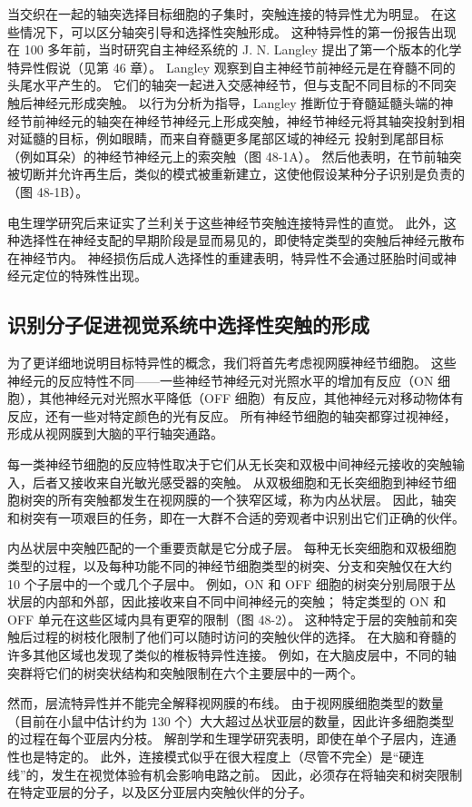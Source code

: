 当交织在一起的轴突选择目标细胞的子集时，突触连接的特异性尤为明显。 在这些情况下，可以区分轴突引导和选择性突触形成。 这种特异性的第一份报告出现在 100 多年前，当时研究自主神经系统的 J. N. Langley 提出了第一个版本的化学特异性假说（见第 46 章）。 Langley 观察到自主神经节前神经元是在脊髓不同的头尾水平产生的。 它们的轴突一起进入交感神经节，但与支配不同目标的不同突触后神经元形成突触。 以行为分析为指导，Langley 推断位于脊髓延髓头端的神经节前神经元的轴突在神经节神经元上形成突触，神经节神经元将其轴突投射到相对延髓的目标，例如眼睛，而来自脊髓更多尾部区域的神经元 投射到尾部目标（例如耳朵）的神经节神经元上的索突触（图 48-1A）。 然后他表明，在节前轴突被切断并允许再生后，类似的模式被重新建立，这使他假设某种分子识别是负责的（图 48-1B）。

电生理学研究后来证实了兰利关于这些神经节突触连接特异性的直觉。 此外，这种选择性在神经支配的早期阶段是显而易见的，即使特定类型的突触后神经元散布在神经节内。 神经损伤后成人选择性的重建表明，特异性不会通过胚胎时间或神经元定位的特殊性出现。

\subsection{识别分子促进视觉系统中选择性突触的形成}
为了更详细地说明目标特异性的概念，我们将首先考虑视网膜神经节细胞。 这些神经元的反应特性不同——一些神经节神经元对光照水平的增加有反应（ON 细胞），其他神经元对光照水平降低（OFF 细胞）有反应，其他神经元对移动物体有反应，还有一些对特定颜色的光有反应。 所有神经节细胞的轴突都穿过视神经，形成从视网膜到大脑的平行轴突通路。

每一类神经节细胞的反应特性取决于它们从无长突和双极中间神经元接收的突触输入，后者又接收来自光敏光感受器的突触。 从双极细胞和无长突细胞到神经节细胞树突的所有突触都发生在视网膜的一个狭窄区域，称为内丛状层。 因此，轴突和树突有一项艰巨的任务，即在一大群不合适的旁观者中识别出它们正确的伙伴。

内丛状层中突触匹配的一个重要贡献是它分成子层。 每种无长突细胞和双极细胞类型的过程，以及每种功能不同的神经节细胞类型的树突、分支和突触仅在大约 10 个子层中的一个或几个子层中。 例如，ON 和 OFF 细胞的树突分别局限于丛状层的内部和外部，因此接收来自不同中间神经元的突触； 特定类型的 ON 和 OFF 单元在这些区域内具有更窄的限制（图 48-2）。 这种特定于层的突触前和突触后过程的树枝化限制了他们可以随时访问的突触伙伴的选择。 在大脑和脊髓的许多其他区域也发现了类似的椎板特异性连接。 例如，在大脑皮层中，不同的轴突群将它们的树突状结构和突触限制在六个主要层中的一两个。

然而，层流特异性并不能完全解释视网膜的布线。 由于视网膜细胞类型的数量（目前在小鼠中估计约为 130 个）大大超过丛状亚层的数量，因此许多细胞类型的过程在每个亚层内分枝。 解剖学和生理学研究表明，即使在单个子层内，连通性也是特定的。 此外，连接模式似乎在很大程度上（尽管不完全）是“硬连线”的，发生在视觉体验有机会影响电路之前。 因此，必须存在将轴突和树突限制在特定亚层的分子，以及区分亚层内突触伙伴的分子。

